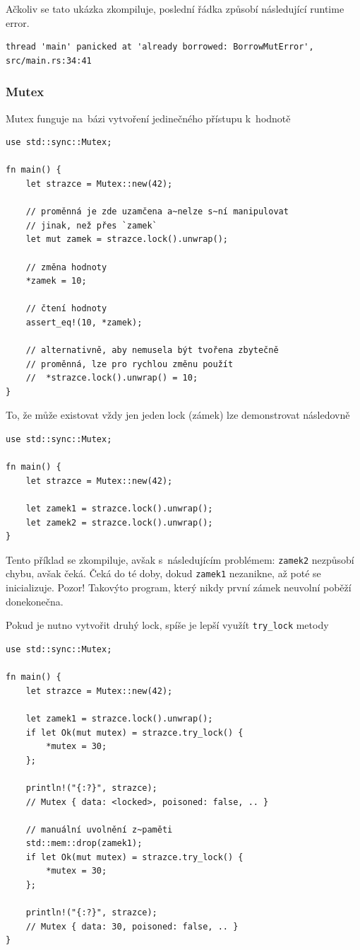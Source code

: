 \documentclass[a4paper, 12pt, twoside]{article} %
\newcommand{\rust}[1]{\texttt{#1}}
\begin{document}
			Ačkoliv se tato ukázka zkompiluje, poslední řádka způsobí následující runtime error.
			\begin{verbatim}
thread 'main' panicked at 'already borrowed: BorrowMutError', src/main.rs:34:41
			\end{verbatim}

		\subsubsection*{Mutex}
			Mutex funguje na~bázi vytvoření jedinečného přístupu k~hodnotě
			\begin{verbatim}
use std::sync::Mutex;

fn main() {
	let strazce = Mutex::new(42);
	
	// proměnná je zde uzamčena a~nelze s~ní manipulovat
	// jinak, než přes `zamek`
	let mut zamek = strazce.lock().unwrap();
	
	// změna hodnoty
	*zamek = 10;
	
	// čtení hodnoty
	assert_eq!(10, *zamek);
	
	// alternativně, aby nemusela být tvořena zbytečně
	// proměnná, lze pro rychlou změnu použít
	//  *strazce.lock().unwrap() = 10;
}
			\end{verbatim}
			
			To, že může existovat vždy jen jeden lock (zámek) lze demonstrovat následovně
			\begin{verbatim}
use std::sync::Mutex;

fn main() {
	let strazce = Mutex::new(42);

	let zamek1 = strazce.lock().unwrap();
	let zamek2 = strazce.lock().unwrap();
}
			\end{verbatim}
			
			Tento příklad se zkompiluje, avšak s~následujícím problémem: \rust{zamek2} nezpůsobí chybu, avšak čeká. Čeká do té doby, dokud \rust{zamek1} nezanikne, až poté se inicializuje. Pozor! Takovýto program, který nikdy první zámek neuvolní poběží donekonečna.
			
			Pokud je nutno vytvořit druhý lock, spíše je lepší využít \rust{try_lock} metody
			\begin{verbatim}
use std::sync::Mutex;

fn main() {
	let strazce = Mutex::new(42);

	let zamek1 = strazce.lock().unwrap();
	if let Ok(mut mutex) = strazce.try_lock() {
		*mutex = 30;
	};

	println!("{:?}", strazce);
	// Mutex { data: <locked>, poisoned: false, .. }

	// manuální uvolnění z~paměti
	std::mem::drop(zamek1);
	if let Ok(mut mutex) = strazce.try_lock() {
		*mutex = 30;
	};

	println!("{:?}", strazce);
	// Mutex { data: 30, poisoned: false, .. }
}
			\end{verbatim}
			
\end{document}
